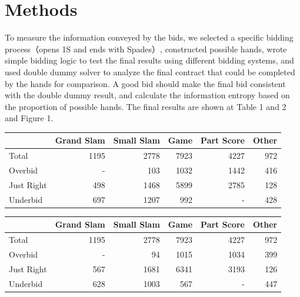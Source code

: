 \documentclass[11pt]{article}
\begin{document}
\section{Methods}
To measure the information conveyed by the bids, we selected a specific bidding process（opens 1S and ends with Spades）, constructed possible hands, wrote simple bidding logic to test the final results using different bidding systems, and used double dummy solver to analyze the final contract that could be completed by the hands for comparison. A good bid should make the final bid consistent with the double dummy result, and calculate the information entropy based on the proportion of possible hands. The final results are shown at Table 1 and 2 and Figure 1.


\begin{center}
    \begin{tabular}{|l|r|r|r|r|r|}
        \hline
         & Grand Slam & Small Slam & Game & Part Score & Other \\
        \hline
        Total & 1195 & 2778 & 7923 & 4227 & 972 \\
        \hline
        Overbid & - & 103 & 1032 & 1442 & 416 \\
        \hline
        Just Right & 498 & 1468 & 5899 & 2785 & 128 \\
        \hline
        Underbid & 697 & 1207 & 992 & - & 428 \\
        \hline
    \end{tabular}
\end{center}


\begin{center}
    \begin{tabular}{|l|r|r|r|r|r|}
    \hline
     & Grand Slam & Small Slam & Game & Part Score & Other \\
    \hline
    Total & 1195 & 2778 & 7923 & 4227 & 972 \\
    \hline
    Overbid & - & 94 & 1015 & 1034 & 399 \\
    \hline
    Just Right & 567 & 1681 & 6341 & 3193 & 126 \\
    \hline
    Underbid & 628 & 1003 & 567 & - & 447 \\
    \hline
    \end{tabular}
\end{center}
\end{document}
